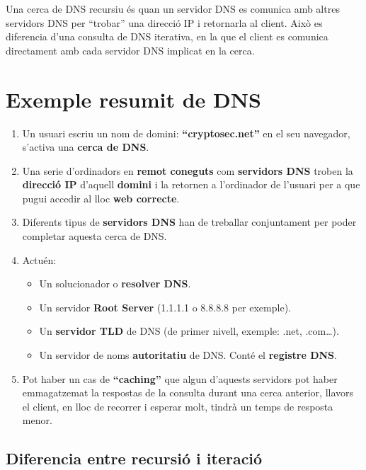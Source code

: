 \documentclass[]{article}
\begin{document}
Una cerca de DNS recursiu és quan un servidor DNS es comunica amb altres
servidors DNS per ``trobar'' una direcció IP i retornarla al client.
Això es diferencia d'una consulta de DNS iterativa, en la que el client
es comunica directament amb cada servidor DNS implicat en la cerca.

\hypertarget{exemple-resumit-de-dns}{%
\section{\texorpdfstring{\textbf{Exemple resumit de
DNS}}{Exemple resumit de DNS}}\label{exemple-resumit-de-dns}}

\begin{enumerate}
\def\labelenumi{\arabic{enumi}.}
\item
  Un usuari escriu un nom de domini: \textbf{``cryptosec.net''} en el
  seu navegador, s'activa una \textbf{cerca de DNS}.
\item
  Una serie d'ordinadors en \textbf{remot coneguts} com
  \textbf{servidors DNS} troben la \textbf{direcció IP} d'aquell
  \textbf{domini} i la retornen a l'ordinador de l'usuari per a que
  pugui accedir al lloc \textbf{web correcte}.
\item
  Diferents tipus de \textbf{servidors DNS} han de treballar
  conjuntament per poder completar aquesta cerca de DNS.
\item
  Actuén:

  \begin{itemize}
  \item
    Un solucionador o \textbf{resolver DNS}.
  \item
    Un servidor \textbf{Root Server} (1.1.1.1 o 8.8.8.8 per exemple).
  \item
    Un \textbf{servidor TLD} de DNS (de primer nivell, exemple: .net,
    .com\ldots{}).
  \item
    Un servidor de noms \textbf{autoritatiu} de DNS. Conté el
    \textbf{registre DNS}.
  \end{itemize}
\item
  Pot haber un cas de \textbf{``caching''} que algun d'aquests servidors
  pot haber emmagatzemat la respostas de la consulta durant una cerca
  anterior, llavors el client, en lloc de recorrer i esperar molt,
  tindrà un temps de resposta menor.
\end{enumerate}

\hypertarget{diferencia-entre-recursiuxf3-i-iteraciuxf3}{%
\subsection{\texorpdfstring{\textbf{Diferencia entre recursió i
iteració}}{Diferencia entre recursió i iteració}}\label{diferencia-entre-recursiuxf3-i-iteraciuxf3}}
\end{document}
